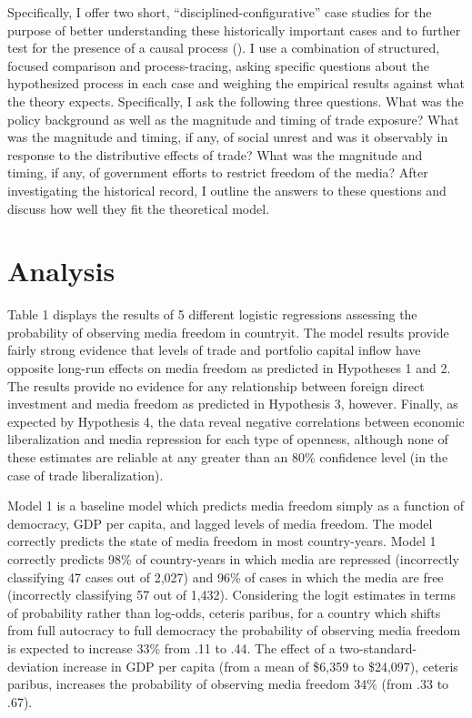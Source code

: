 \documentclass[12pt]{report}
\begin{document}
Specifically, I offer two short, ``disciplined-configurative'' case
studies for the purpose of better understanding these historically
important cases and to further test for the presence of a causal process
(\citealt[75]{george2005case}). I use a combination of structured,
focused comparison and process-tracing, asking specific questions
about the hypothesized process in each case and weighing the empirical
results against what the theory expects. Specifically, I ask the following
three questions. What was the policy background as well as the magnitude
and timing of trade exposure? What was the magnitude and timing, if
any, of social unrest and was it observably in response to the distributive
effects of trade? What was the magnitude and timing, if any, of government
efforts to restrict freedom of the media? After investigating the
historical record, I outline the answers to these questions and discuss
how well they fit the theoretical model.

\section{Analysis}

Table 1 displays the results of 5 different logistic regressions assessing
the probability of observing media freedom in countryit.
The model results provide fairly strong evidence that levels of trade
and portfolio capital inflow have opposite long-run effects on media
freedom as predicted in Hypotheses 1 and 2. The results provide no
evidence for any relationship between foreign direct investment and
media freedom as predicted in Hypothesis 3, however. Finally, as expected
by Hypothesis 4, the data reveal negative correlations between economic
liberalization and media repression for each type of openness, although
none of these estimates are reliable at any greater than an 80\% confidence
level (in the case of trade liberalization).

Model 1 is a baseline model which predicts media freedom simply as
a function of democracy, GDP per capita, and lagged levels of media
freedom. The model correctly predicts the state of media freedom in
most country-years. Model 1 correctly predicts 98\% of country-years
in which media are repressed (incorrectly classifying 47 cases out
of 2,027) and 96\% of cases in which the media are free (incorrectly
classifying 57 out of 1,432). Considering the logit estimates in terms
of probability rather than log-odds, ceteris paribus, for a country
which shifts from full autocracy to full democracy the probability
of observing media freedom is expected to increase 33\% from .11 to
.44. The effect of a two-standard-deviation increase in GDP per capita
(from a mean of \$6,359 to \$24,097), ceteris paribus, increases the
probability of observing media freedom 34\% (from .33 to .67).
\end{document}

